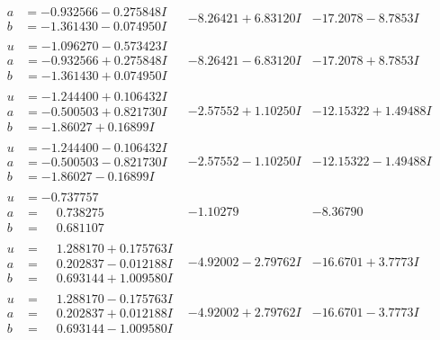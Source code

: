 \documentclass[1p]{elsarticle_modified}
\theoremstyle{definition}
\begin{document}
$$\begin{array}{c|c|c}
\begin{aligned}
a &= -0.932566 - 0.275848 I \\
b &= -1.361430 - 0.074950 I\end{aligned}
 & -8.26421 + 6.83120 I & -17.2078 - 8.7853 I \\ \hline\begin{aligned}
u &= -1.096270 - 0.573423 I \\
a &= -0.932566 + 0.275848 I \\
b &= -1.361430 + 0.074950 I\end{aligned}
 & -8.26421 - 6.83120 I & -17.2078 + 8.7853 I \\ \hline\begin{aligned}
u &= -1.244400 + 0.106432 I \\
a &= -0.500503 + 0.821730 I \\
b &= -1.86027 + 0.16899 I\end{aligned}
 & -2.57552 + 1.10250 I & -12.15322 + 1.49488 I \\ \hline\begin{aligned}
u &= -1.244400 - 0.106432 I \\
a &= -0.500503 - 0.821730 I \\
b &= -1.86027 - 0.16899 I\end{aligned}
 & -2.57552 - 1.10250 I & -12.15322 - 1.49488 I \\ \hline\begin{aligned}
u &= -0.737757\phantom{ +0.000000I} \\
a &= \phantom{-}0.738275\phantom{ +0.000000I} \\
b &= \phantom{-}0.681107\phantom{ +0.000000I}\end{aligned}
 & -1.10279\phantom{ +0.000000I} & -8.36790\phantom{ +0.000000I} \\ \hline\begin{aligned}
u &= \phantom{-}1.288170 + 0.175763 I \\
a &= \phantom{-}0.202837 - 0.012188 I \\
b &= \phantom{-}0.693144 + 1.009580 I\end{aligned}
 & -4.92002 - 2.79762 I & -16.6701 + 3.7773 I \\ \hline\begin{aligned}
u &= \phantom{-}1.288170 - 0.175763 I \\
a &= \phantom{-}0.202837 + 0.012188 I \\
b &= \phantom{-}0.693144 - 1.009580 I\end{aligned}
 & -4.92002 + 2.79762 I & -16.6701 - 3.7773 I \\ \hline\begin{aligned}

\end{aligned}
\end{array}$$
\end{document}
